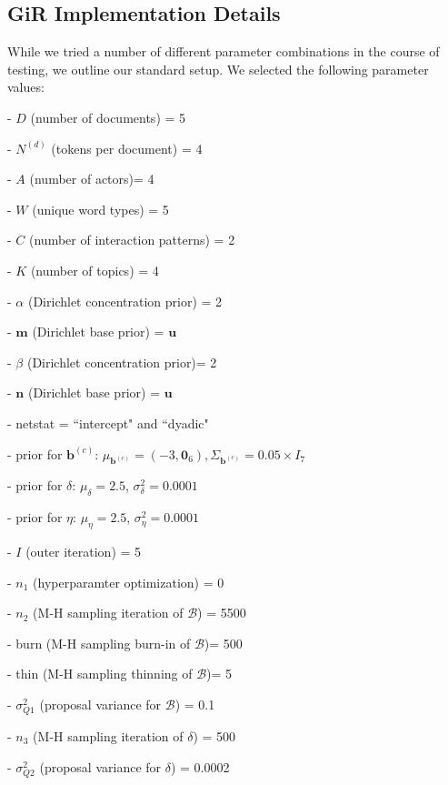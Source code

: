 \documentclass[a4paper]{article}
\begin{document}
  \subsection{GiR Implementation Details} \label{subsec: GiR implementation}
  While we tried a number of different parameter combinations in the course of testing, we outline our standard setup. We selected the following parameter values:
  \begin{itemize}
  	\begin{minipage}{0.49\textwidth}
  		\item[-] $D$ (number of documents) = 5
  		\item[-] $N^{(d)}$ (tokens per document) = 4
  		\item[-] $A$ (number of actors)= 4
  		\item[-] $W$ (unique word types) = 5
  		\item[-] $C$ (number of interaction patterns) = 2
  		\item[-] $K$ (number of topics) = 4
  		\item[-] $\alpha$ (Dirichlet concentration prior) = 2
  		\item[-] $\boldsymbol{m}$ (Dirichlet base prior) = $\boldsymbol{u}$ 
  		\item[-] $\beta$ (Dirichlet concentration prior)= 2
  		\item[-] $\boldsymbol{n}$ (Dirichlet base prior) = $\boldsymbol{u}$
  		\item[-] netstat = ``intercept" and ``dyadic"
  	\end{minipage}
  	\begin{minipage}{0.49\textwidth}
  		\item[-] prior for $\boldsymbol{b}^{(c)}$: $\mu_{\boldsymbol{b}^{(c)}} = (-3,\boldsymbol{0}_6), \Sigma_{\boldsymbol{b}^{(c)}} = 0.05\times I_7$
  		\item[-] prior for $\delta$: $\mu_\delta = 2.5$, $\sigma^2_\delta = 0.0001$
  		\item[-] prior for $\eta$: $\mu_\eta = 2.5$, $\sigma^2_\eta = 0.0001$
  		\item[-] $I$ (outer iteration) = 5
  		\item[-] $n_1$ (hyperparamter optimization) = 0
  		\item[-] $n_2$ (M-H sampling iteration of $\mathcal{B}$) = 5500
  		\item[-] burn (M-H sampling burn-in of $\mathcal{B}$)= 500
  		\item[-] thin (M-H sampling thinning of $\mathcal{B}$)= 5
  		\item[-] $\sigma_{Q1}^2$ (proposal variance for $\mathcal{B}$) = 0.1
  		\item[-] $n_3$ (M-H sampling iteration of $\delta$) = 500
  		\item[-] $\sigma_{Q2}^2$ (proposal variance for $\delta$) = 0.0002
  	\end{minipage}
  \end{itemize}        
\end{document}
